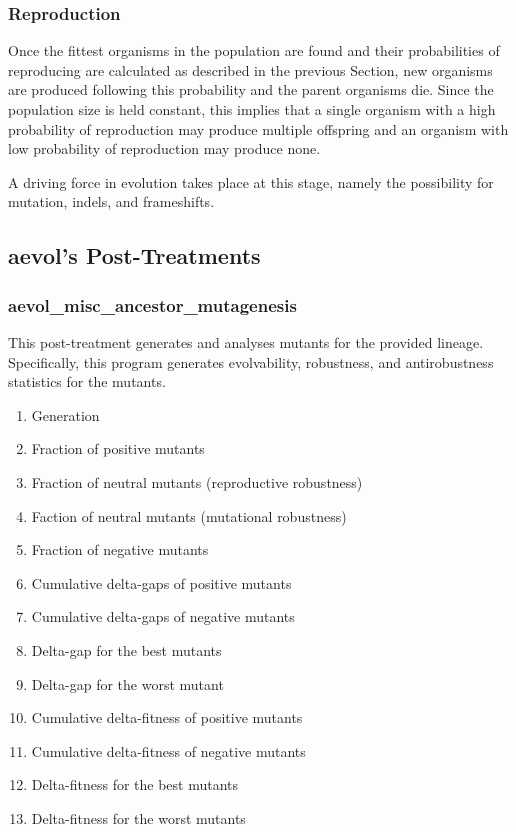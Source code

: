 \subsubsection{Reproduction}
Once the fittest organisms in the population are found and their probabilities of reproducing are calculated as described in the previous Section, new organisms are produced following this probability and the parent organisms die. Since the population size is held constant, this implies that a single organism with a high probability of reproduction may produce multiple offspring and an organism with low probability of reproduction may produce none.

A driving force in evolution takes place at this stage, namely the possibility for mutation, indels, and frameshifts. 
\subsection{aevol's Post-Treatments}\label{aevol_post-treatments}



\subsubsection{aevol\_misc\_ancestor\_mutagenesis}
This post-treatment generates and analyses mutants for the provided lineage. Specifically, this program generates evolvability, robustness, and antirobustness statistics for the mutants. 
\begin{enumerate}
	\item Generation
	\item Fraction of positive mutants
	\item Fraction of neutral mutants (reproductive robustness)
	\item Faction of neutral mutants (mutational robustness)
	\item Fraction of negative mutants
	\item Cumulative delta-gaps of positive mutants
	\item Cumulative delta-gaps of negative mutants
	\item Delta-gap for the best mutants
	\item Delta-gap for the worst mutant
	\item Cumulative delta-fitness of positive mutants
	\item Cumulative delta-fitness of negative mutants
	\item Delta-fitness for the best mutants
	\item Delta-fitness for the worst mutants
\end{enumerate}
